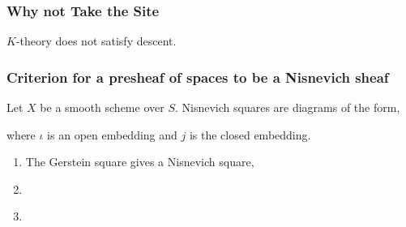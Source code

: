 \documentclass[12pt]{article}
\begin{document}
\subsubsection{Why not Take the \etale Site}

$K$-theory does not satisfy \etale descent. 

\subsubsection{Criterion for a presheaf of spaces to be a Nisnevich sheaf}

\begin{defn}
Let $X$ be a smooth scheme over $S$. Nisnevich squares are diagrams of the form,
\begin{center}
\end{center}
where $\iota$ is an open embedding and $j$ is the closed embedding. 
\end{defn}

\begin{example}
\begin{enumerate}
\item 
The Gerstein square gives a Nisnevich square,
\begin{center}
\end{center}

\item 

\begin{center}
\end{center}

\item 
\end{enumerate}
\end{example}
\end{document}
